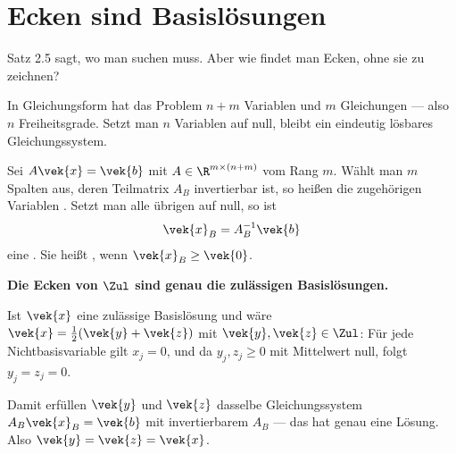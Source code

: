 \section{Ecken sind Basislösungen}

\begin{merksatz}
Satz 2.5 sagt, wo man suchen muss. Aber wie findet man Ecken, ohne sie zu zeichnen?

In Gleichungsform hat das Problem $n+m$ Variablen und $m$ Gleichungen --- also $n$ Freiheitsgrade. Setzt man $n$ Variablen auf null, bleibt ein eindeutig lösbares Gleichungssystem.
\end{merksatz}

\begin{definition}
Sei $A\vek{x} = \vek{b}$ mit $A \in \R^{m\times(n+m)}$ vom Rang $m$. Wählt man $m$ Spalten aus, deren Teilmatrix $A_B$ invertierbar ist, so heißen die zugehörigen Variablen . Setzt man alle übrigen auf null, so ist
\[ \vek{x}_B = A_B^{-1}\vek{b} \]
eine . Sie heißt , wenn $\vek{x}_B \ge \vek{0}$.
\end{definition}

\begin{merksatz}
\begin{center}
\begin{minipage}{0.9\textwidth}
\textbf{Die Ecken von $\Zul$ sind genau die zulässigen Basislösungen.}
\end{minipage}
\end{center}

Ist $\vek{x}$ eine zulässige Basislösung und wäre $\vek{x} = \frac12(\vek{y}+\vek{z})$ mit $\vek{y},\vek{z} \in \Zul$: Für jede Nichtbasisvariable gilt $x_j = 0$, und da $y_j, z_j \ge 0$ mit Mittelwert null, folgt $y_j = z_j = 0$.

Damit erfüllen $\vek{y}$ und $\vek{z}$ dasselbe Gleichungssystem $A_B\vek{x}_B = \vek{b}$ mit invertierbarem $A_B$ --- das hat genau eine Lösung. Also $\vek{y}=\vek{z}=\vek{x}$.

\begin{center}
\begin{minipage}{0.88\textwidth}
\end{minipage}
\end{center}
\end{merksatz}

